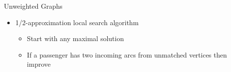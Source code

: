 \begin{frame}{Unweighted Graphs}
\begin{itemize}
	\item 1/2-approximation local search algorithm
	\begin{itemize}
	  \item Start with any maximal solution
	  \item If a passenger has two incoming arcs from unmatched vertices then
	  improve
	\end{itemize}
\end{itemize}
\centering

\end{frame}